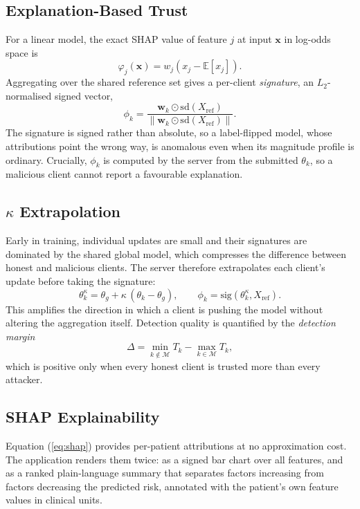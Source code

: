 \documentclass[conference]{IEEEtran}
\begin{document}
\subsection{Explanation-Based Trust}
\label{sec:expltrust}
For a linear model, the exact SHAP value of feature $j$ at input
$\mathbf{x}$ in log-odds space is
\begin{equation}
 \varphi_j(\mathbf{x}) = w_j\left(x_j - \mathbb{E}[x_j]\right).
 \label{eq:shap}
\end{equation}
Aggregating over the shared reference set gives a per-client
\emph{signature}, an $L_2$-normalised signed vector,
\begin{equation}
 \phi_k = \frac{\mathbf{w}_k \odot \mathrm{sd}(X_{\mathrm{ref}})}
 {\lVert \mathbf{w}_k \odot \mathrm{sd}(X_{\mathrm{ref}})\rVert}.
 \label{eq:signature}
\end{equation}
The signature is signed rather than absolute, so a label-flipped model, whose
attributions point the wrong way, is anomalous even when its magnitude
profile is ordinary. Crucially, $\phi_k$ is computed by the server from the
submitted $\theta_k$, so a malicious client cannot report a favourable
explanation.

\subsection{$\kappa$ Extrapolation}
Early in training, individual updates are small and their signatures are
dominated by the shared global model, which compresses the difference
between honest and malicious clients. The server therefore extrapolates each
client's update before taking the signature:
\begin{equation}
 \theta_k^{\kappa} = \theta_g + \kappa\,(\theta_k - \theta_g),
 \qquad
 \phi_k = \mathrm{sig}\!\left(\theta_k^{\kappa}, X_{\mathrm{ref}}\right).
 \label{eq:kappa}
\end{equation}
This amplifies the direction in which a client is pushing the model without
altering the aggregation itself. Detection quality is quantified by the
\emph{detection margin}
\begin{equation}
 \Delta = \min_{k \notin \mathcal{M}} T_k - \max_{k \in \mathcal{M}} T_k,
 \label{eq:margin}
\end{equation}
which is positive only when every honest client is trusted more than every
attacker.

\subsection{SHAP Explainability}
Equation (\ref{eq:shap}) provides per-patient attributions at no
approximation cost. The application renders them twice: as a signed bar chart
over all features, and as a ranked plain-language summary that separates
factors increasing from factors decreasing the predicted risk, annotated with
the patient's own feature values in clinical units.
\end{document}
